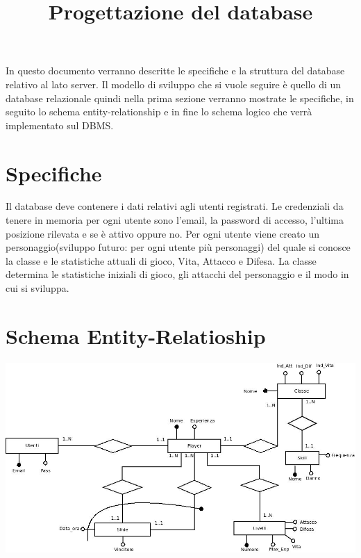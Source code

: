 \documentclass[a4paper,12pt]{article}
\title{Progettazione del database}
\begin{document}
\maketitle

In questo documento verranno descritte le specifiche e la struttura del database relativo al lato server. Il modello di sviluppo che si vuole seguire è quello di un database relazionale quindi nella prima sezione verranno mostrate le specifiche, in seguito lo schema entity-relationship e in fine lo schema logico che verrà implementato sul DBMS. 

\section*{Specifiche}
Il database deve contenere i dati relativi agli utenti registrati. Le credenziali da tenere in memoria per ogni utente sono l'email, la password di accesso, l'ultima posizione rilevata e se è attivo oppure no. Per ogni utente viene creato un personaggio(sviluppo futuro: per ogni utente più personaggi) del quale si conosce la classe e le statistiche attuali di gioco, Vita, Attacco e Difesa. La classe determina le statistiche iniziali di gioco, gli attacchi del personaggio e il modo in cui si sviluppa. 
\section*{Schema Entity-Relatioship}
\includegraphics[scale=0.4]{SchemaER.jpeg}
\end{document}
